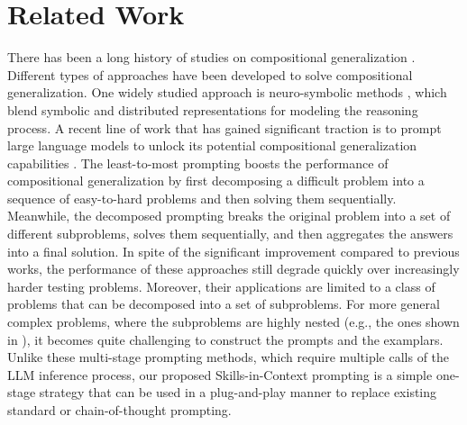 \section{Related Work}
\label{sec: related works}


There has been a long history of studies on compositional generalization \citep{lake2018generalization,jia2016data, andreas2019good,lake2018generalization,ouyang2023compositional,keysers2020measuring,chen2020compositional,dziri2023faith,shao2023compositional,saparov2022language,nye2021show,welleck2022naturalprover,dong2019neural,schwarzschild2021can}. Different types of approaches have been developed to solve compositional generalization. One widely studied approach is neuro-symbolic methods \citep{dong2019neural,schwarzschild2021can}, which blend symbolic and distributed representations for modeling the reasoning process. A recent line of work that has gained significant traction is to prompt large language models to unlock its potential compositional generalization capabilities \citep{nye2021show,zhou2022least,khot2022decomposed,dua2022successive,dziri2023faith}. The least-to-most prompting \citep{zhou2022least} boosts the performance of compositional generalization by first decomposing a difficult problem into a sequence of easy-to-hard problems and then solving them sequentially. Meanwhile, the decomposed prompting \citep{khot2022decomposed} breaks the original problem into a set of different subproblems, solves them sequentially, and then aggregates the answers into a final solution. In spite of the significant improvement compared to previous works, the performance of these approaches still degrade quickly over increasingly harder testing problems. Moreover, their applications are limited to a class of problems that can be decomposed into a set of subproblems. For more general complex problems, where the subproblems are highly nested (e.g., the ones shown in \citet{dziri2023faith}), it becomes quite challenging to construct the prompts and the examplars. Unlike these multi-stage prompting methods, which require multiple calls of the LLM inference process, our proposed Skills-in-Context prompting is a simple one-stage strategy that can be used in a plug-and-play manner to replace existing standard or chain-of-thought prompting.

